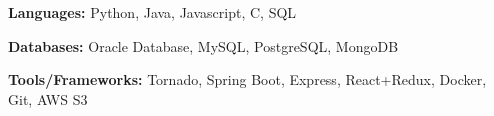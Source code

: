 \begin{siderulesSos}
\begin{skillSection}
\cvskillentry
    {
      \begin{cvsositems}
        \item {\color{black}\textbf{Languages:} Python, Java, Javascript, C, SQL}
        \item {\color{black}\textbf{Databases:} Oracle Database, MySQL, PostgreSQL, MongoDB}
        \item {\color{black}\textbf{Tools/Frameworks:} Tornado, Spring Boot, Express, React+Redux, Docker, Git, AWS S3 }
      \end{cvsositems}
    }
\end{skillSection}
\end{siderulesSos}
